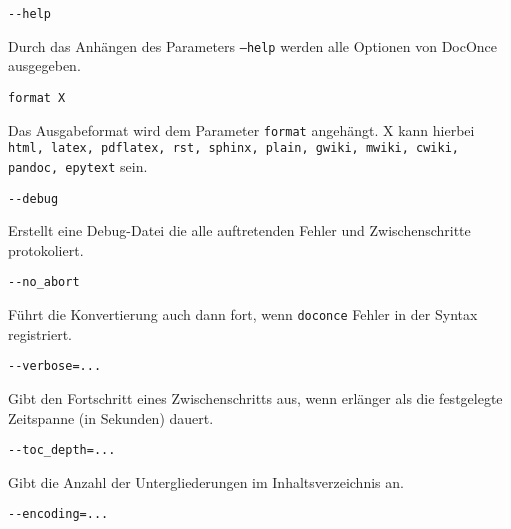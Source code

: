 \documentclass[%
oneside,                 %
final,                   %
chapterprefix=true,      %
open=right,              %
10pt]{book}
\begin{document}
\begin{verbatim}
--help
\end{verbatim}

Durch das Anhängen des Parameters \texttt{--help} werden alle Optionen von DocOnce ausgegeben.

\begin{verbatim}
format X
\end{verbatim}

Das Ausgabeformat wird dem Parameter \texttt{format} angehängt. X kann hierbei \texttt{html, latex, pdflatex, rst, sphinx, plain, gwiki, mwiki, cwiki, pandoc, epytext} sein.

\begin{verbatim}
--debug
\end{verbatim}

Erstellt eine Debug-Datei die alle auftretenden Fehler und Zwischenschritte protokoliert.

\begin{verbatim}
--no_abort
\end{verbatim}

Führt die Konvertierung auch dann fort, wenn \texttt{doconce} Fehler in der Syntax registriert.

\begin{verbatim}
--verbose=...
\end{verbatim}

Gibt den Fortschritt eines Zwischenschritts aus, wenn erlänger als die festgelegte Zeitspanne (in Sekunden) dauert.

\begin{verbatim}
--toc_depth=...
\end{verbatim}

Gibt die Anzahl der Untergliederungen im Inhaltsverzeichnis an.

\begin{verbatim}
--encoding=...
\end{verbatim}
\end{document}
